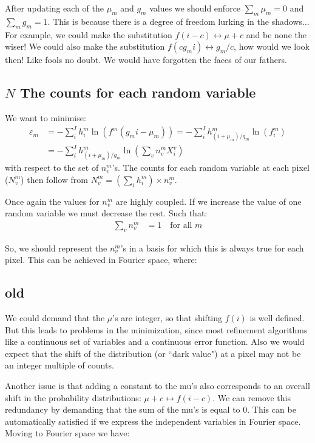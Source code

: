 \documentclass[11pt]{article}
\begin{document}
After updating each of the $\mu_m$ and $g_m$ values we should enforce $\sum_m \mu_m = 0$ and $\sum_m g_m = 1$. This is because there is a degree of freedom lurking in the shadows... For example, we could make the substitution $f(i - c) \leftrightarrow \mu + c$ and be none the wiser! We could also make the substitution $f(c g_m i) \leftrightarrow g_m / c$, how would we look then! Like fools no doubt. We would have forgotten the faces of our fathers. 
 
\subsection{$N$ The counts for each random variable}
We want to minimise:
\begin{align}
   \varepsilon_m &= -\sum_i^I h^m_i \ln(f^m(g_mi - \mu_m)) = -\sum_i^I h^m_{(i+\mu_m)/g_m} \ln(f^m_i) \\
   &= - \sum_i^I h^m_{(i+\mu_m)/g_m} \ln\left(\sum_v n^m_v X^v_i\right)
\end{align}
with respect to the set of $n^m_v$'s. The counts for each random variable at each pixel ($N^m_v$) then follow from $N^m_v = (\sum_i h^m_i) \times n^m_v$.

Once again the values for $n^m_v$ are highly coupled. If we increase the value of one random variable we must decrease the rest. Such that:
\begin{align}
   \sum_v n^m_v &= 1  \quad \text{for all } m 
\end{align}

So, we should represent the $n^m_v$'s in a basis for which this is always true for each pixel. This can be achieved in Fourier space, where:



\subsection{old}
We could demand that the $\mu$'s are integer, so that shifting $f(i)$ is well defined. But this leads to problems in the minimization, since most refinement algorithms like a continuous set of variables and a continuous error function. Also we would expect that the shift of the distribution (or ``dark value") at a pixel may not be an integer multiple of counts. 

Another issue is that adding a constant to the mu's also corresponds to an overall shift in the probability distributions: $\mu + c \longleftrightarrow  f(i - c)$. We can remove this redundancy by demanding that the sum of the mu's is equal to 0. This can be automatically satisfied if we express the independent variables in Fourier space. Moving to Fourier space we have:
\end{document}
